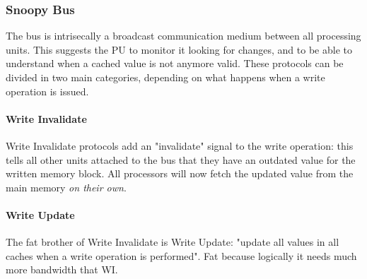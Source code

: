 \documentclass[10pt,a4paper]{article}
\begin{document}
				\subsubsection{Snoopy Bus}
					The bus is intrisecally a broadcast communication medium between all processing units. This suggests the PU to monitor it looking for changes, and to be able to understand when a cached value is not anymore valid. These protocols can be divided in two main categories, depending on what happens when a write operation is issued.
					
					\paragraph{Write Invalidate}
						Write Invalidate protocols add an "invalidate" signal to the write operation: this tells all other units attached to the bus that they have an outdated value for the written memory block. All processors will now fetch the updated value from the main memory \emph{on their own}. 
					
					\paragraph{Write Update}
						The fat brother of Write Invalidate is Write Update: "update all values in all caches when a write operation is performed". Fat because logically it needs much more bandwidth that WI.
						
\end{document}
